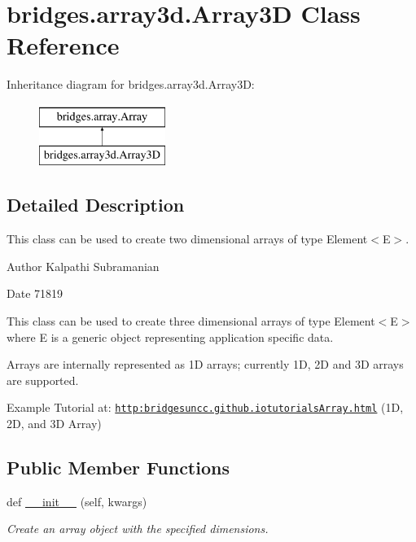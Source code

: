 \hypertarget{classbridges_1_1array3d_1_1_array3_d}{}\section{bridges.\+array3d.\+Array3D Class Reference}
\label{classbridges_1_1array3d_1_1_array3_d}
Inheritance diagram for bridges.\+array3d.\+Array3D\+:\begin{figure}[H]
\begin{center}
\leavevmode
\includegraphics[height=2.000000cm]{classbridges_1_1array3d_1_1_array3_d}
\end{center}
\end{figure}


\subsection{Detailed Description}
This class can be used to create two dimensional arrays of type Element$<$\+E$>$. 

\begin{DoxyAuthor}{Author}
Kalpathi Subramanian
\end{DoxyAuthor}
\begin{DoxyDate}{Date}
71819
\end{DoxyDate}
This class can be used to create three dimensional arrays of type Element$<$\+E$>$ where E is a generic object representing application specific data.

Arrays are internally represented as 1D arrays; currently 1D, 2D and 3D arrays are supported.

Example Tutorial at\+: \href{http:bridgesuncc.github.iotutorialsArray.html}{\tt http\+:bridgesuncc.\+github.\+iotutorials\+Array.\+html} (1D, 2D, and 3D Array)~\newline
 \subsection*{Public Member Functions}
\begin{DoxyCompactItemize}
\item 
def \hyperlink{classbridges_1_1array3d_1_1_array3_d_a2ab3261c784068e2b4fdf388a972b1e3}{\+\_\+\+\_\+init\+\_\+\+\_\+} (self, kwargs)
\begin{DoxyCompactList}\small\item\em Create an array object with the specified dimensions. \end{DoxyCompactList}\end{DoxyCompactItemize}
